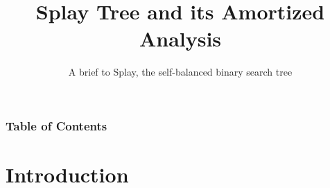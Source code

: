 \documentclass{beamer}
\title{Splay Tree and its Amortized Analysis}
\subtitle{A brief to Splay, the self-balanced binary search tree}
\theoremstyle{plain}
\begin{document}
    \begin{frame}
        \maketitle
    \end{frame}

    \begin{frame}
        \frametitle{Table of Contents}
    
        \tableofcontents
    
    \end{frame}

    \section{Introduction}
\end{document}

